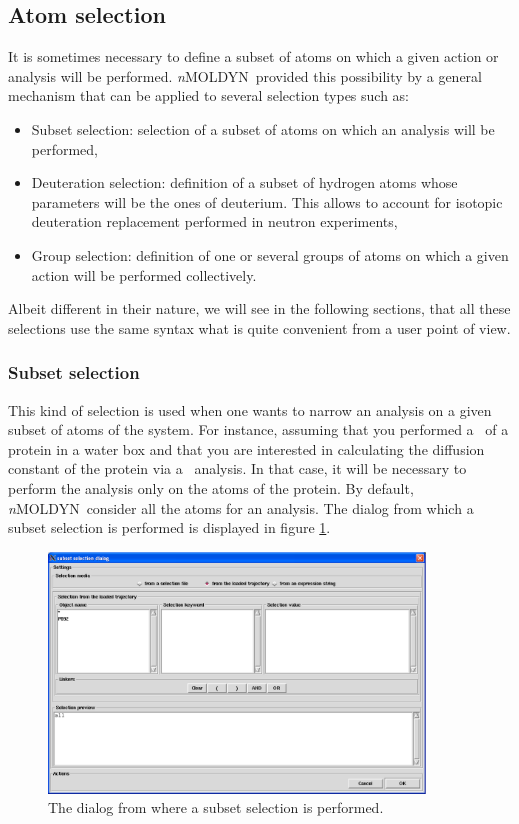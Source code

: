 \documentclass[a4paper,11pt]{report}
\newcommand{\NMOLDYN}{\textit{n}MOLDYN}
\begin{document}
\subsection{Atom selection}
\label{atom_selection}
It is sometimes necessary to define a subset of atoms on which a given action or analysis will be performed.
\NMOLDYN\ provided this possibility by a general mechanism that can be applied to several selection types such 
as:
\begin{itemize}
\item Subset selection: selection of a subset of atoms on which an analysis will be performed,
\item Deuteration selection: definition of a subset of hydrogen atoms whose parameters will be the ones of deuterium. This allows 
to account for isotopic deuteration replacement performed in neutron experiments,
\item Group selection: definition of one or several groups of atoms on which a given action will be performed collectively.
\end{itemize}
Albeit different in their nature, we will see in the following sections, that all these selections use the same syntax 
what is quite convenient from a user point of view.

\subsubsection{Subset selection}
\label{subset_selection}
This kind of selection is used when one wants to narrow an analysis on a given subset of atoms of the 
system. For instance, assuming that you performed a \MD\ of a protein in a water box and that 
you are interested in calculating the diffusion constant of the protein via a \MSD\ analysis. In that case, 
it will be necessary to perform the analysis only on the atoms of the protein. 
\newpage
By default, \NMOLDYN\ consider all the atoms for an analysis. The dialog from which a subset selection is performed 
is displayed in figure \ref{fig:subset_selection}.
\begin{figure}[h!]
\begin{center}
\includegraphics[width=10cm]{Figures/subset_selection.eps}
\end{center}
\caption[The subset selection dialog]{The dialog from where a subset selection is performed.}
\label{fig:subset_selection}
\end{figure}   
\end{document}

